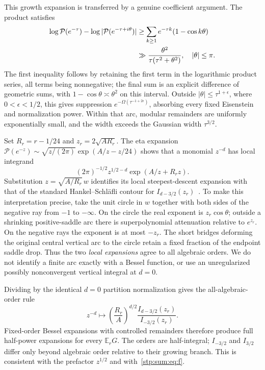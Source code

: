 \documentclass[11pt]{article}
\theoremstyle{remark}\newtheorem{remark}[theorem]{Remark}
\newcommand{\E}{\mathbb E}
\newcommand{\cP}{\mathcal P}
\begin{document}
This growth expansion is transferred by a genuine coefficient argument. The product satisfies
\begin{align}
 \log\cP(e^{-\tau})-\log|\cP(e^{-\tau+i\theta})|
 &\ge\sum_{k\ge1}e^{-\tau k}(1-\cos k\theta)\notag\\
 &\gg\frac{\theta^2}{\tau(\tau^2+\theta^2)},\quad |\theta|\le\pi.
 \label{stp:sum:eq:Pminor}
\end{align}
The first inequality follows by retaining the first term in the logarithmic product series, all terms being nonnegative; the final sum is an explicit difference of geometric sums, with $1-\cos\theta\asymp\theta^2$ on this interval. Outside $|\theta|\le\tau^{1+\epsilon}$, where $0<\epsilon<1/2$, this gives suppression $e^{-\Omega(\tau^{-1+2\epsilon})}$, absorbing every fixed Eisenstein and normalization power. Within that arc, modular remainders are uniformly exponentially small, and the width exceeds the Gaussian width $\tau^{3/2}$.

Set $R_r=r-1/24$ and $z_r=2\sqrt{AR_r}$. The eta expansion
$\cP(e^{-z})\sim\sqrt{z/(2\pi)}\exp(A/z-z/24)$ shows that a monomial $z^{-d}$ has local integrand
\[
 (2\pi)^{-1/2}z^{1/2-d}\exp(A/z+R_rz).
\]
Substitution $z=\sqrt{A/R_r}\,w$ identifies its local steepest-descent expansion with that of the standard Hankel--Schläfli contour for $I_{d-3/2}(z_r)$~\cite{dlmfbessel}. To make this interpretation precise, take the unit circle in $w$ together with both sides of the negative ray from $-1$ to $-\infty$. On the circle the real exponent is $z_r\cos\theta$; outside a shrinking positive-saddle arc there is superpolynomial attenuation relative to $e^{z_r}$. On the negative rays the exponent is at most $-z_r$. The short bridges deforming the original central vertical arc to the circle retain a fixed fraction of the endpoint saddle drop. Thus the two \emph{local expansions} agree to all algebraic orders. We do not identify a finite arc exactly with a Bessel function, or use an unregularized possibly nonconvergent vertical integral at $d=0$.

Dividing by the identical $d=0$ partition normalization gives the all-algebraic-order rule
\begin{equation}\label{stp:sum:eq:Besselrule}
 z^{-d}\longmapsto
 \left(\frac{R_r}{A}\right)^{d/2}
 \frac{I_{d-3/2}(z_r)}{I_{-3/2}(z_r)}.
\end{equation}
Fixed-order Bessel expansions with controlled remainders therefore produce full half-power expansions for every $\E_rG$. The orders are half-integral; $I_{-3/2}$ and $I_{3/2}$ differ only beyond algebraic order relative to their growing branch. This is consistent with the prefactor $z^{1/2}$ and with~\eqref{stp:sum:eq:f}.
\end{document}
